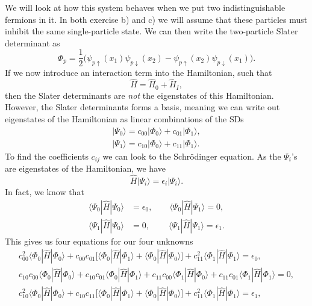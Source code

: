 \documentclass[a4paper, 11pt, notitlepage, english]{article}
\newcommand{\bra}[1]{\langle #1|}
\newcommand{\ket}[1]{|#1 \rangle}
\newcommand{\op}[1]{\hat{#1}}
\newcommand{\braopket}[3]{\langle #1 | {#2} | #3 \rangle}
\newcommand{\eps}{\epsilon}
\begin{document}
We will look at how this system behaves when we put two indistinguishable fermions in it. In both exercise b) and c) we will assume that these particles must inhibit the same single-particle state. We can then write the two-particle Slater determinant as
$$\Phi_p = \frac{1}{2}\bigg(\psi_{p\uparrow}(x_1)\psi_{p\downarrow}(x_2) - \psi_{p\uparrow}(x_2)\psi_{p\downarrow}(x_1)\bigg).$$ 
If we now introduce an interaction term into the Hamiltonian, such that
$$\op{H} = \op{H}_0 + \op{H}_I,$$
then the Slater determinants are \emph{not} the eigenstates of this Hamiltonian. However, the Slater determinants forms a basis, meaning we can write out eigenstates of the Hamiltonian as linear combinations of the SDs
\begin{align*}
\ket{\Psi_0} = c_{00}\ket{\Phi_0} + c_{01}\ket{\Phi_1}, \\
\ket{\Psi_1} = c_{10}\ket{\Phi_0} + c_{11}\ket{\Phi_1}.
\end{align*}
To find the coefficients $c_{ij}$ we can look to the Schrödinger equation. As the $\Psi_i$'s are eigenstates of the Hamiltonian, we have
$$\op{H}\ket{\Psi_i} = \eps_i\ket{\Psi_i}.$$ 
In fact, we know that
\begin{align*}
\bra{\Psi_0}\op{H}\ket{\Psi_0} &= \eps_0, \qquad \bra{\Psi_0}\op{H}\ket{\Psi_1} = 0, \\
\bra{\Psi_1}\op{H}\ket{\Psi_0} &= 0, \qquad \ \bra{\Psi_1}\op{H}\ket{\Psi_1} = \eps_1.
\end{align*}
This gives us four equations for our four unknowns
\begin{align*} 
c_{00}^2\braopket{\Phi_0}{\op{H}}{\Phi_0} + c_{00}c_{01}\big[\braopket{\Phi_0}{\op{H}}{\Phi_1} + \braopket{\Phi_0}{\op{H}}{\Phi_0}\big]  + c_{11}^2 \braopket{\Phi_1}{\op{H}}{\Phi_1} = \eps_0, \\
c_{10}c_{00}\braopket{\Phi_0}{\op{H}}{\Phi_0} + c_{10}c_{01}\braopket{\Phi_0}{\op{H}}{\Phi_1} + c_{11}c_{00}\braopket{\Phi_1}{\op{H}}{\Phi_0}  + c_{11}c_{01} \braopket{\Phi_1}{\op{H}}{\Phi_1} = 0, \\
c_{10}^2\braopket{\Phi_0}{\op{H}}{\Phi_0} + c_{10}c_{11}\big[\braopket{\Phi_0}{\op{H}}{\Phi_1} + \braopket{\Phi_0}{\op{H}}{\Phi_0}\big]  + c_{11}^2 \braopket{\Phi_1}{\op{H}}{\Phi_1} = \eps_1, \\
\end{align*}



\end{document}
